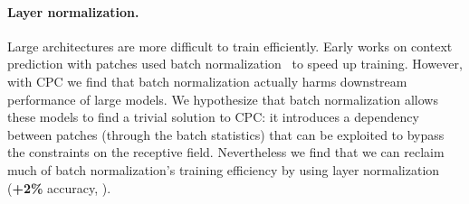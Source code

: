 \documentclass{article}
\begin{document}
\paragraph{Layer normalization.} Large architectures are more difficult to train efficiently. Early works on context prediction with patches used batch normalization~\citep{ioffe2015batch,doersch2015unsupervised} to speed up training. However, with CPC we find that batch normalization actually harms downstream performance of large models.  We hypothesize that batch normalization allows these models to find a trivial solution to CPC: it introduces a dependency between patches (through the batch statistics) that can be exploited to bypass the constraints on the receptive field. Nevertheless we find that we can reclaim much of batch normalization's training efficiency by using layer normalization (\textbf{+2\%} accuracy, \citet{ba2016layernorm}).
\end{document}
